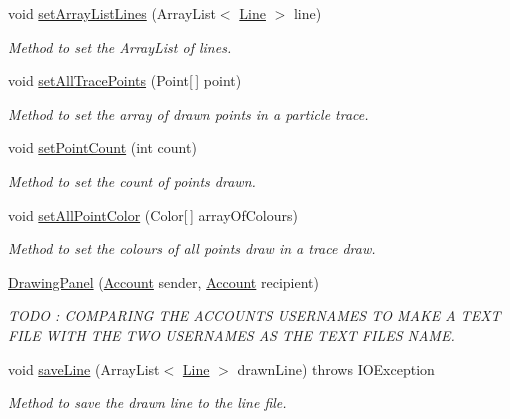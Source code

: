 \begin{DoxyCompactItemize}
void \hyperlink{class_drawing_panel_a7fd34e1524b98d70607998bafbc71d8b}{set\+Array\+List\+Lines} (Array\+List$<$ \hyperlink{class_line}{Line} $>$ line)
\begin{DoxyCompactList}\small\item\em Method to set the Array\+List of lines. \end{DoxyCompactList}\item 
void \hyperlink{class_drawing_panel_a47cd7b7965dd2cb7e63f56a2737ffe39}{set\+All\+Trace\+Points} (Point\mbox{[}$\,$\mbox{]} point)
\begin{DoxyCompactList}\small\item\em Method to set the array of drawn points in a particle trace. \end{DoxyCompactList}\item 
void \hyperlink{class_drawing_panel_a3c4886846e221ed78b1859d0d022cf8f}{set\+Point\+Count} (int count)
\begin{DoxyCompactList}\small\item\em Method to set the count of points drawn. \end{DoxyCompactList}\item 
void \hyperlink{class_drawing_panel_a9816f7a7b7aeefeb6f0e5d9321eb94a2}{set\+All\+Point\+Color} (Color\mbox{[}$\,$\mbox{]} array\+Of\+Colours)
\begin{DoxyCompactList}\small\item\em Method to set the colours of all points draw in a trace draw. \end{DoxyCompactList}\item 
\hyperlink{class_drawing_panel_a63d04db10fba53e2b46d536525d278ac}{Drawing\+Panel} (\hyperlink{class_account}{Account} sender, \hyperlink{class_account}{Account} recipient)
\begin{DoxyCompactList}\small\item\em T\+O\+DO \+: C\+O\+M\+P\+A\+R\+I\+NG T\+HE A\+C\+C\+O\+U\+N\+TS U\+S\+E\+R\+N\+A\+M\+ES TO M\+A\+KE A T\+E\+XT F\+I\+LE W\+I\+TH T\+HE T\+WO U\+S\+E\+R\+N\+A\+M\+ES AS T\+HE T\+E\+XT F\+I\+LE\textquotesingle{}S N\+A\+ME. \end{DoxyCompactList}\item 
void \hyperlink{class_drawing_panel_a9fe458b4cbb53b245a7d7edc0a2d1e83}{save\+Line} (Array\+List$<$ \hyperlink{class_line}{Line} $>$ drawn\+Line)  throws I\+O\+Exception 
\begin{DoxyCompactList}\small\item\em Method to save the drawn line to the line file. \end{DoxyCompactList}\item 

\end{DoxyCompactItemize}
